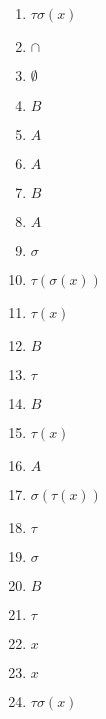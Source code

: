\begin{multicols}{5}
\begin{enumerate}
\item
$\tau\sigma(x)$

\item
$\cap$

\item
$\emptyset$

\item
$B$


\item
$A$

\item
$A$

\item
$B$

\item
$A$

\item
$\sigma$

\item
$\tau(\sigma(x))$

\item
$\tau(x)$

\item
$B$

\item
$\tau$

\item
$B$

\item
$\tau(x)$

\item
$A$

\item
$\sigma(\tau(x))$

\item
$\tau$

\item
$\sigma$

\item
$B$

\item
$\tau$

\item
$x$

\item
$x$

\item
$\tau\sigma(x)$
\end{enumerate}
\end{multicols}

